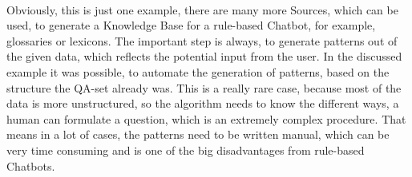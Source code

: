 \documentclass[10pt,final,journal,a4paper,oneside,twocolumn]{IEEEtran}
\begin{document}
\\
Obviously, this is just one example, there are many more Sources, which can be used, to generate a Knowledge Base for a rule-based Chatbot, for example, glossaries or lexicons. The important step is always, to generate patterns out of the given data, which reflects the potential input from the user. In the discussed example it was possible, to automate the generation of patterns, based on the structure the QA-set already was. This is a really rare case, because most of the data is more unstructured, so the algorithm needs to know the different ways, a human can formulate a question, which is an extremely complex procedure. That means in a lot of cases, the patterns need to be written manual, which can be very time consuming and is one of the big disadvantages from rule-based Chatbots.
\\
\end{document}
